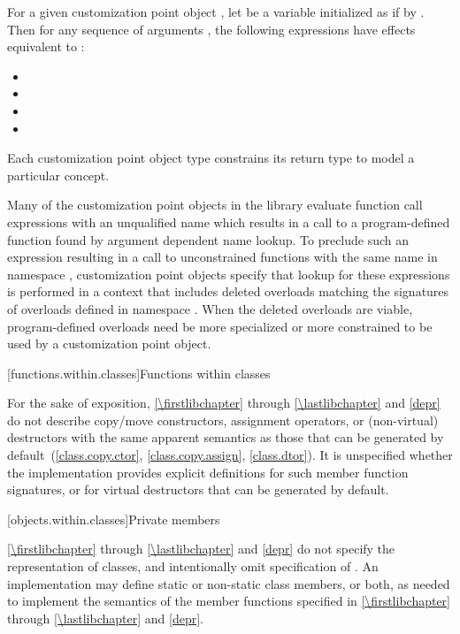 \pnum
For a given customization point object ,
let  be a variable initialized as if by .
Then for any sequence of arguments ,
the following expressions have effects equivalent to :
\begin{itemize}
\item {}
\item {}
\item {}
\item {}
\end{itemize}

\pnum
Each customization point object type constrains its return type to model a
particular concept.

\pnum
\begin{note}
Many of the customization point objects in the library evaluate function call
expressions with an unqualified name which results in a call to a
program-defined function found by argument dependent name
lookup. To preclude such an expression resulting in a
call to unconstrained functions with the same name in namespace ,
customization point objects specify that lookup for these expressions is
performed in a context that includes deleted overloads matching the signatures
of overloads defined in namespace . When the deleted overloads are
viable, program-defined overloads need be more specialized
or more constrained to be used by a customization point
object.
\end{note}

[functions.within.classes]{Functions within classes}

\pnum
For the sake of exposition, \ref{\firstlibchapter} through \ref{\lastlibchapter}
and \ref{depr} do not describe copy/move constructors, assignment
operators, or (non-virtual) destructors with the same apparent
semantics as those that can be generated
by default~(\ref{class.copy.ctor}, \ref{class.copy.assign}, \ref{class.dtor}).
%
%
%
It is unspecified whether
the implementation provides explicit definitions for such member function
signatures, or for virtual destructors that can be generated by default.

[objects.within.classes]{Private members}

\pnum
\ref{\firstlibchapter} through \ref{\lastlibchapter} and
\ref{depr} do not specify the representation of classes, and intentionally
omit specification of . An implementation may
define static or non-static class members, or both, as needed to implement the
semantics of the member functions specified in \ref{\firstlibchapter}
through \ref{\lastlibchapter} and \ref{depr}.

